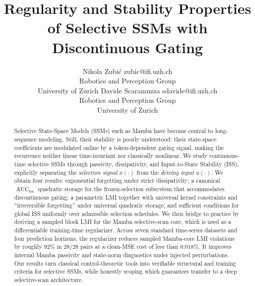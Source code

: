 \documentclass[10pt]{article} %
\title{Regularity and Stability Properties of Selective SSMs with Discontinuous Gating}
\author{\name Nikola Zubić \email zubic@ifi.uzh.ch \\
      \addr Robotics and Perception Group\\
      University of Zurich
      \AND
      \name Davide Scaramuzza \email sdavide@ifi.uzh.ch \\
      \addr Robotics and Perception Group\\
      University of Zurich}
\newcommand{\loc}{\mathrm{loc}}                         %
\DeclareMathOperator{\AUC}{AUC}                         %
\theoremstyle{definition}
\begin{document}
\maketitle

\begin{abstract}
Selective State-Space Models (SSMs) such as Mamba have become central to long-sequence modeling. Still, their stability is poorly understood: their state-space coefficients are modulated online by a token-dependent gating signal, making the recurrence neither linear time-invariant nor classically nonlinear. We study continuous-time selective SSMs through passivity, dissipativity, and Input-to-State Stability (ISS), explicitly separating the \emph{selection signal} $x(\cdot)$ from the \emph{driving input} $u(\cdot)$. We obtain four results: exponential forgetting under strict dissipativity; a canonical $\AUC_{\loc}$ quadratic storage for the frozen-selection subsystem that accommodates discontinuous gating; a parametric LMI together with universal kernel constraints and ``irreversible forgetting'' under universal quadratic storage; and sufficient conditions for global ISS uniformly over admissible selection schedules. We then bridge to practice by deriving a sampled block LMI for the Mamba selective-scan core, which is used as a differentiable training-time regularizer. Across seven standard time-series datasets and four prediction horizons, the regularizer reduces sampled Mamba-core LMI violations by roughly $92\%$ in $28/28$ pairs at a clean-MSE cost of less than $0.018\%$. It improves internal Mamba passivity and state-norm diagnostics under injected perturbations. Our results turn classical control-theoretic tools into verifiable structural and training criteria for selective SSMs, while honestly scoping which guarantees transfer to a deep selective-scan architecture.
\end{abstract}
\end{document}

